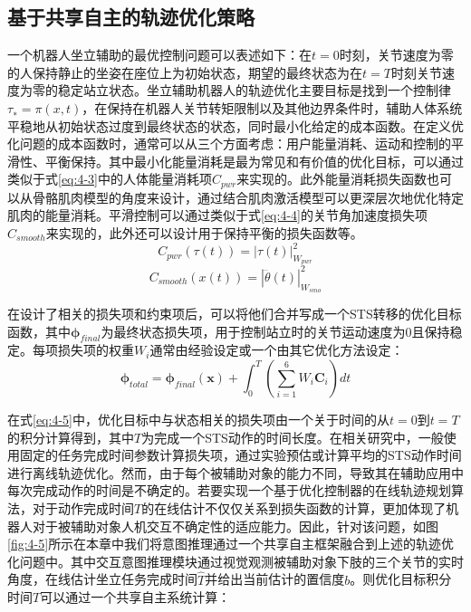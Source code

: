 \subsection{基于共享自主的轨迹优化策略}
一个机器人坐立辅助的最优控制问题可以表述如下：在$t=0$时刻，关节速度为零的人保持静止的坐姿在座位上为初始状态，期望的最终状态为在$t=T$时刻关节速度为零的稳定站立状态。坐立辅助机器人的轨迹优化主要目标是找到一个控制律$τ_∗= π(x,t)$，在保持在机器人关节转矩限制以及其他边界条件时，辅助人体系统平稳地从初始状态过度到最终状态的状态，同时最小化给定的成本函数。在定义优化问题的成本函数时，通常可以从三个方面考虑：用户能量消耗、运动和控制的平滑性、平衡保持。其中最小化能量消耗是最为常见和有价值的优化目标，可以通过类似于式\ref{eq:4-3}中的人体能量消耗项$C_{pwr}$来实现的。此外能量消耗损失函数也可以从骨骼肌肉模型的角度来设计，通过结合肌肉激活模型可以更深层次地优化特定肌肉的能量消耗\cite{kumarPredictingSittoStandAdaptations2022}。平滑控制可以通过类似于式\ref{eq:4-4}的关节角加速度损失项$C_{smooth}$来实现的，此外还可以设计用于保持平衡的损失函数等。
\begin{equation}
    C_{pwr}(\tau(t))=|\tau(t)|_{W_{pwr}}^2
    \label{eq:4-3}
\end{equation}
\begin{equation}
    C_{smooth}(x(t))=|\dddot{\theta}(t)|_{W_{smo}}^2
    \label{eq:4-4}
\end{equation}

在设计了相关的损失项和约束项后，可以将他们合并写成一个STS转移的优化目标函数，其中$\boldsymbol{\phi}_{final}$为最终状态损失项，用于控制站立时的关节运动速度为0且保持稳定。每项损失项的权重$W_i$通常由经验设定或一个由其它优化方法设定：
\begin{equation}
    \boldsymbol{\phi}_{total}=\boldsymbol{\phi}_{final}(\boldsymbol{x})+\int_0^T\left(\sum_{i=1}^6 W_i \boldsymbol{C}_i\right) dt
    \label{eq:4-5}
\end{equation}

在式\ref{eq:4-5}中，优化目标中与状态相关的损失项由一个关于时间的从$t=0$到$t=T$的积分计算得到，其中$T$为完成一个STS动作的时间长度。在相关研究中，一般使用固定的任务完成时间参数计算损失项，通过实验预估或计算平均的STS动作时间进行离线轨迹优化。然而，由于每个被辅助对象的能力不同，导致其在辅助应用中每次完成动作的时间是不确定的。若要实现一个基于优化控制器的在线轨迹规划算法，对于动作完成时间$T$的在线估计不仅仅关系到损失函数的计算，更加体现了机器人对于被辅助对象人机交互不确定性的适应能力。因此，针对该问题，如图\ref{fig:4-5}所示在本章中我们将意图推理通过一个共享自主框架融合到上述的轨迹优化问题中。其中交互意图推理模块通过视觉观测被辅助对象下肢的三个关节的实时角度，在线估计坐立任务完成时间$\hat T$并给出当前估计的置信度$b$。则优化目标积分时间$T$可以通过一个共享自主系统计算：

